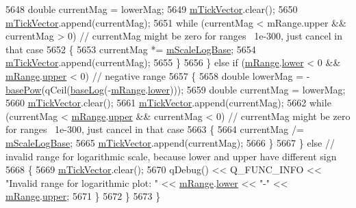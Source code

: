 \begin{DoxyCode}
5648       \textcolor{keywordtype}{double} currentMag = lowerMag;
5649       \hyperlink{class_q_c_p_axis_aae0f9b9973b85be601200f00f5825087}{mTickVector}.clear();
5650       \hyperlink{class_q_c_p_axis_aae0f9b9973b85be601200f00f5825087}{mTickVector}.append(currentMag);
5651       \textcolor{keywordflow}{while} (currentMag < mRange.upper && currentMag > 0) \textcolor{comment}{// currentMag might be zero for ranges ~1e-300,
       just cancel in that case}
5652       \{
5653         currentMag *= \hyperlink{class_q_c_p_axis_abc727ddb4af745151755d1b5e60d03c3}{mScaleLogBase};
5654         \hyperlink{class_q_c_p_axis_aae0f9b9973b85be601200f00f5825087}{mTickVector}.append(currentMag);
5655       \}
5656     \} \textcolor{keywordflow}{else} \textcolor{keywordflow}{if} (\hyperlink{class_q_c_p_axis_a1ee36773c49062d751560e11f90845f7}{mRange}.\hyperlink{class_q_c_p_range_aa3aca3edb14f7ca0c85d912647b91745}{lower} < 0 && \hyperlink{class_q_c_p_axis_a1ee36773c49062d751560e11f90845f7}{mRange}.\hyperlink{class_q_c_p_range_ae44eb3aafe1d0e2ed34b499b6d2e074f}{upper} < 0) \textcolor{comment}{// negative range}
5657     \{
5658       \textcolor{keywordtype}{double} lowerMag = -\hyperlink{class_q_c_p_axis_a97d69f021a05126fcb978d0aefea47b8}{basePow}(qCeil(\hyperlink{class_q_c_p_axis_a1385765db2419ee5fb5505a6cf9130fb}{baseLog}(-\hyperlink{class_q_c_p_axis_a1ee36773c49062d751560e11f90845f7}{mRange}.\hyperlink{class_q_c_p_range_aa3aca3edb14f7ca0c85d912647b91745}{lower})));
5659       \textcolor{keywordtype}{double} currentMag = lowerMag;
5660       \hyperlink{class_q_c_p_axis_aae0f9b9973b85be601200f00f5825087}{mTickVector}.clear();
5661       \hyperlink{class_q_c_p_axis_aae0f9b9973b85be601200f00f5825087}{mTickVector}.append(currentMag);
5662       \textcolor{keywordflow}{while} (currentMag < \hyperlink{class_q_c_p_axis_a1ee36773c49062d751560e11f90845f7}{mRange}.\hyperlink{class_q_c_p_range_ae44eb3aafe1d0e2ed34b499b6d2e074f}{upper} && currentMag < 0) \textcolor{comment}{// currentMag might be zero for ranges
       ~1e-300, just cancel in that case}
5663       \{
5664         currentMag /= \hyperlink{class_q_c_p_axis_abc727ddb4af745151755d1b5e60d03c3}{mScaleLogBase};
5665         \hyperlink{class_q_c_p_axis_aae0f9b9973b85be601200f00f5825087}{mTickVector}.append(currentMag);
5666       \}
5667     \} \textcolor{keywordflow}{else} \textcolor{comment}{// invalid range for logarithmic scale, because lower and upper have different sign}
5668     \{
5669       \hyperlink{class_q_c_p_axis_aae0f9b9973b85be601200f00f5825087}{mTickVector}.clear();
5670       qDebug() << Q\_FUNC\_INFO << \textcolor{stringliteral}{"Invalid range for logarithmic plot: "} << 
      \hyperlink{class_q_c_p_axis_a1ee36773c49062d751560e11f90845f7}{mRange}.\hyperlink{class_q_c_p_range_aa3aca3edb14f7ca0c85d912647b91745}{lower} << \textcolor{stringliteral}{"-"} << \hyperlink{class_q_c_p_axis_a1ee36773c49062d751560e11f90845f7}{mRange}.\hyperlink{class_q_c_p_range_ae44eb3aafe1d0e2ed34b499b6d2e074f}{upper};
5671     \}
5672   \}
5673 \}
\end{DoxyCode}


